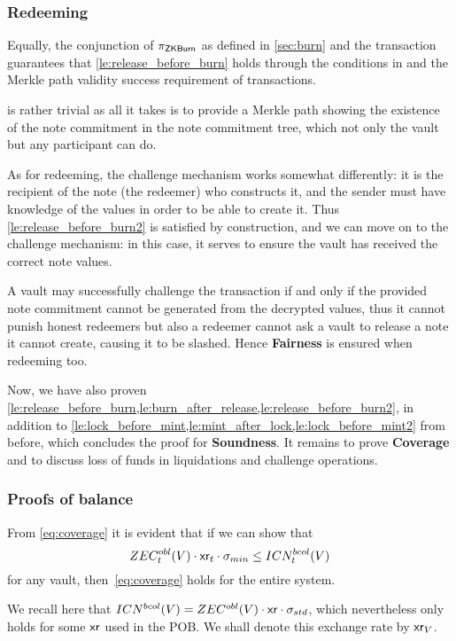 \subsubsection{Redeeming}

Equally, the conjunction of $\pi_{\mathsf{ZKBurn}}$ as defined in \cref{sec:burn} and the \confirmRedeem transaction guarantees that \cref{le:release_before_burn} holds through the conditions in \pib and the Merkle path validity success requirement of \confirmRedeem transactions.

 is rather trivial as all it takes is to provide a Merkle path showing the existence of the note commitment in the note commitment tree, which not only the vault but any participant can do.

As for redeeming, the challenge mechanism works somewhat differently: it is the recipient of the note (the redeemer) who constructs it, and the sender must have knowledge of the values in order to be able to create it.
Thus \cref{le:release_before_burn2} is satisfied by construction, and we can move on to the challenge mechanism: in this case, it serves to ensure the vault has received the correct note values.

A vault may successfully challenge the transaction if and only if the provided note commitment cannot be generated from the decrypted values, thus it cannot punish honest redeemers but also a redeemer cannot ask a vault to release a note it cannot create, causing it to be slashed.
Hence \textbf{Fairness} is ensured when redeeming too.

Now, we have also proven \cref{le:release_before_burn,le:burn_after_release,le:release_before_burn2}, in addition to \cref{le:lock_before_mint,le:mint_after_lock,le:lock_before_mint2} from before, which concludes the proof for \textbf{Soundness}.
It remains to prove \textbf{Coverage} and to discuss loss of funds in liquidations and challenge operations.

\subsubsection{Proofs of balance}

From \cref{eq:coverage} it is evident that if we can show that 
\[
    ZEC^{obl}_t(V) \cdot \mathsf{xr}_t \cdot \sigma_{min} \leq ICN^{bcol}_t(V)
\]
for any vault, then~\eqref{eq:coverage} holds for the entire system.

We recall here that $ICN^{bcol}(V) = ZEC^{obl}(V) \cdot \mathsf{xr} \cdot \sigma_{std}$, which nevertheless only holds for some $\mathsf{xr}$ used in the POB.
We shall denote this exchange rate by $\mathsf{xr}_V$.

